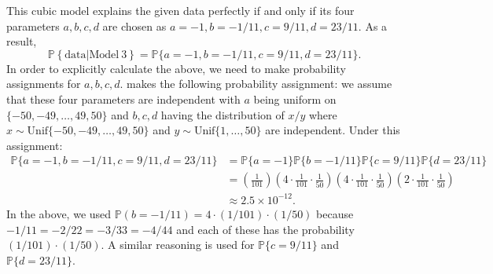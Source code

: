\documentclass{scrartcl}
\renewcommand{\P}{{\mathbb P}}
\begin{document}
This cubic model explains the given data perfectly if and only if its four
parameters $a, b, c, d$ are chosen as $a  = -1, b = -1/11, c = 9/11, d
= 23/11$.  As a result,
\begin{equation*}
  \P \left\{\text{data} | \text{Model}~3 \right\} = \P\{a = -1, b =
  -1/11, c = 9/11, d = 23/11\}. 
\end{equation*}
In order to explicitly calculate the above, we need to make
probability assignments for $a, b, c, d$. \citet{MacKay} makes the
following probability assignment: we assume that these four parameters
are independent with $a$ being uniform on $\{-50, -49, \dots, 49,
50\}$ and $b, c, d$ having the distribution of $x/y$ where $x \sim
\text{Unif}\{-50, -49, \dots, 49, 50\}$ and $y \sim \text{Unif}\{1,
\dots, 50\}$ are independent. Under this assignment: 
\begin{align*}
  \P\{a = -1, b =
  -1/11, c = 9/11, d = 23/11\} &= \P\{a = -1\} \P\{b = -1/11\} \P\{c =
                                 9/11\} \P\{d = 23/11\}\\ &=\left(\frac{1}{101} \right) \left(4
  \cdot \frac{1}{101} 
    \cdot \frac{1}{50} \right)  \left(4 \cdot \frac{1}{101}
    \cdot \frac{1}{50} \right)  \left(2 \cdot \frac{1}{101}
    \cdot \frac{1}{50} \right) \\ & \approx 2.5 \times 10^{-12}. 
\end{align*}
In the above, we used $\P(b = -1/11) = 4 \cdot(1/101)\cdot (1/50)$ because
$-1/11 = -2/22 = -3/33 = -4/44$ and each of these has the probability
$(1/101) \cdot (1/50)$. A similar reasoning is used for $\P\{c =
9/11\}$ and $\P\{d = 23/11\}$.
\end{document}
